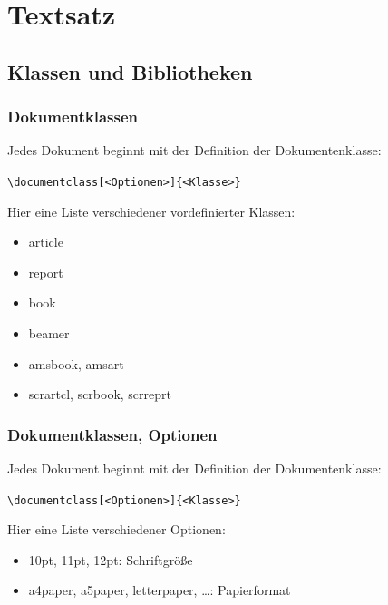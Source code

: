 \section{Textsatz}
\subsection{Klassen und Bibliotheken}

\begin{frame}[fragile,t]
\frametitle{Dokumentklassen}
Jedes Dokument beginnt mit der Definition der Dokumentenklasse:
\begin{center}
\lstinline[style=Latex]+\documentclass[<Optionen>]{<Klasse>}+
\end{center}
\pause
Hier eine Liste verschiedener vordefinierter Klassen:\pause
\begin{itemize}[<+->]
  \item article
  \item report
  \item book
  \item beamer
  \item amsbook, amsart %
  \item scrartcl, scrbook, scrreprt %
\end{itemize}
\end{frame}


\begin{frame}[fragile,t]
\frametitle{Dokumentklassen, Optionen}
Jedes Dokument beginnt mit der Definition der Dokumentenklasse:
\begin{center}
\lstinline[style=Latex]+\documentclass[<Optionen>]{<Klasse>}+
\end{center}
Hier eine Liste verschiedener Optionen:\pause
\begin{itemize}[<+->]
  \item 10pt, 11pt, 12pt: Schriftgröße
  \item a4paper, a5paper, letterpaper, \ldots: Papierformat
\end{itemize}
\end{frame}

